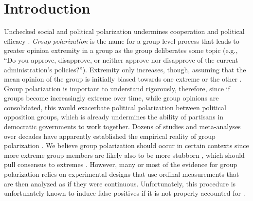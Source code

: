 \documentclass[
  abstract]{article}
\begin{document}
\section{Introduction}\label{introduction}

Unchecked social and political polarization undermines cooperation and
political efficacy \autocite{Mason2018UncivilAgreementBook,Klein2020}.
\emph{Group polarization} is the name for a group-level process that
leads to greater opinion extremity in a group as the group deliberates
some topic (e.g., ``Do you approve, disapprove, or neither approve nor
disapprove of the current administration's policies?''). Extremity only
increases, though, assuming that the mean opinion of the group is
initially biased towards one extreme or the other
\autocite{Brown1986,Brown2020}. Group polarization is important to
understand rigorously, therefore, since if groups become increasingly
extreme over time, while group opinions are consolidated, this would
exacerbate political polarization between political opposition groups,
which is already undermines the ability of partisans in democratic
governments to work together. Dozens of studies and meta-analyses over
decades have apparently established the empirical reality of group
polarization
\autocite{Moscovici1969,Myers1970,Isenberg1986,Sunstein2009,Sunstein2019}
\autocite[Ch. 5]{Brown2000}. We believe group polarization should occur
in certain contexts since more extreme group members are likely also to
be more stubborn \autocite{Guazzini2015,Lewandowsky2019}, which should
pull consensus to extremes \autocite{Turner2020}. However, many or most
of the evidence for group polarization relies on experimental designs
that use ordinal measurements that are then analyzed as if they were
continuous. Unfortunately, this procedure is unfortunately known to
induce false positives if it is not properly accounted for
\autocite{Liddell2018}.
\end{document}
